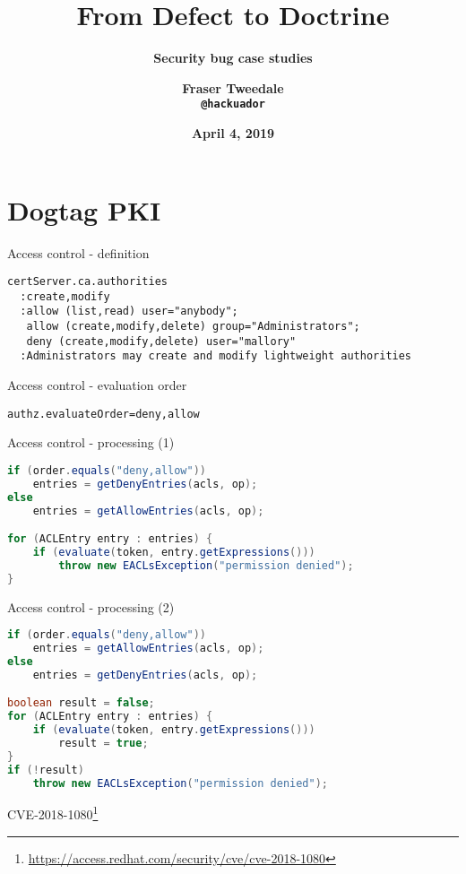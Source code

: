 \documentclass[ignorenonframetext,aspectratio=169,dvipsnames]{beamer}
\title{\bf From Defect to Doctrine}
\subtitle{\bf Security bug case studies}
\author{\bf Fraser Tweedale\\
    \texttt{@hackuador}}
\date{\bf April 4, 2019}
\begin{document}
\begin{frame}
\titlepage
\end{frame}

\section{Dogtag PKI}\label{dogtag}

\begin{frame}[fragile]{Access control - definition}
\large
\begin{verbatim}
certServer.ca.authorities
  :create,modify
  :allow (list,read) user="anybody";
   allow (create,modify,delete) group="Administrators";
   deny (create,modify,delete) user="mallory"
  :Administrators may create and modify lightweight authorities
\end{verbatim}
\end{frame}

\begin{frame}[fragile]{Access control - evaluation order}
\Large
\begin{verbatim}
authz.evaluateOrder=deny,allow
\end{verbatim}
\end{frame}

\begin{frame}[fragile]{Access control - processing (1)}
\begin{lstlisting}[language=Java]
if (order.equals("deny,allow"))
    entries = getDenyEntries(acls, op);
else
    entries = getAllowEntries(acls, op);

for (ACLEntry entry : entries) {
    if (evaluate(token, entry.getExpressions()))
        throw new EACLsException("permission denied");
}
\end{lstlisting}
\end{frame}

\begin{frame}[fragile]{Access control - processing (2)}
\begin{lstlisting}[language=Java]
if (order.equals("deny,allow"))
    entries = getAllowEntries(acls, op);
else
    entries = getDenyEntries(acls, op);

boolean result = false;
for (ACLEntry entry : entries) {
    if (evaluate(token, entry.getExpressions()))
        result = true;
}
if (!result)
    throw new EACLsException("permission denied");
\end{lstlisting}
\end{frame}


\begin{frame}[plain]
\huge
  CVE-2018-1080\footnote[frame]{
    \url{https://access.redhat.com/security/cve/cve-2018-1080}}
\end{frame}
\end{document}
